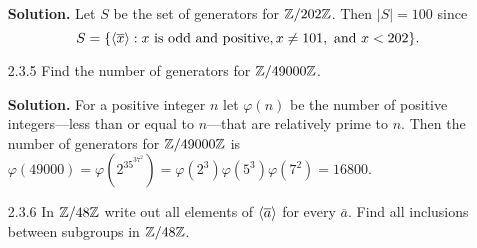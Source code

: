 \begin{enumerate}
      \textbf{Solution.} Let $S$ be the set of generators for $\mathbb{Z}/202\mathbb{Z}$. Then
      $|S| = 100$ since
      $$S = \{\langle \overline{x} \rangle : x \text{ is odd and positive}, x \neq 101, \text{ and }
        x < 202\}.$$
   \item[2.3.5]   Find the number of generators for $\mathbb{Z}/49000\mathbb{Z}$.
   
      \textbf{Solution.} For a positive integer $n$ let $\varphi(n)$ be the
      number of positive integers---less than or equal to $n$---that are
      relatively prime to $n$. Then the number of generators for $\mathbb{Z}/49000\mathbb{Z}$ is
      $\varphi(49000) = \varphi(2^35^37^2) =
      \varphi(2^3)\varphi(5^3)\varphi(7^2) = 16800$. 
   \item[2.3.6]   In $\mathbb{Z}/48\mathbb{Z}$ write out all elements of $\langle \overline{a} \rangle$
                  for every $\overline{a}$. Find all inclusions between
                  subgroups in $\mathbb{Z}/48\mathbb{Z}$.
      

\end{enumerate}
